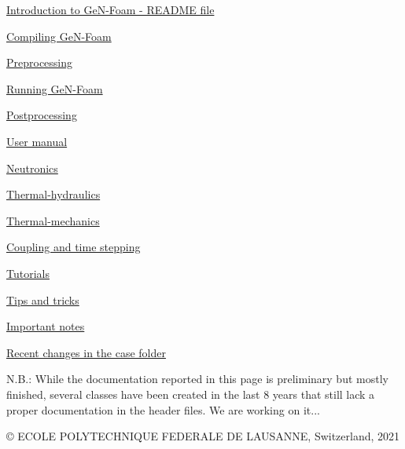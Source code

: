 
\begin{DoxyItemize}
\item \hyperlink{README}{Introduction to Ge\+N-\/\+Foam -\/ R\+E\+A\+D\+ME file}
\begin{DoxyItemize}
\item \hyperlink{COMPILE}{Compiling Ge\+N-\/\+Foam}
\item \hyperlink{PREPROCESSING}{Preprocessing}
\item \hyperlink{RUNNING}{Running Ge\+N-\/\+Foam}
\item \hyperlink{POSTPROCESSING}{Postprocessing}
\end{DoxyItemize}
\item \hyperlink{USERMAN}{User manual}
\begin{DoxyItemize}
\item \hyperlink{NEUTRONICS}{Neutronics}
\item \hyperlink{TH}{Thermal-\/hydraulics}
\item \hyperlink{TM}{Thermal-\/mechanics}
\item \hyperlink{COUPLING}{Coupling and time stepping}
\end{DoxyItemize}
\item \hyperlink{TUTORIALS}{Tutorials}
\item \hyperlink{TIPS}{Tips and tricks}
\item \hyperlink{NOTES}{Important notes}
\item \hyperlink{CHANGES}{Recent changes in the case folder}
\end{DoxyItemize}

 N.\+B.\+: While the documentation reported in this page is preliminary but mostly finished, several classes have been created in the last 8 years that still lack a proper documentation in the header files. We are working on it...

© E\+C\+O\+LE P\+O\+L\+Y\+T\+E\+C\+H\+N\+I\+Q\+UE F\+E\+D\+E\+R\+A\+LE DE L\+A\+U\+S\+A\+N\+NE, Switzerland, 2021 
